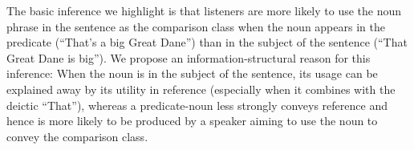 \documentclass[10pt,letterpaper]{article}
\begin{document}

The basic inference we highlight is that listeners are more likely to use the noun phrase in the sentence as the comparison class when the noun appears in the predicate (``That's a big Great Dane'') than in the subject of the sentence (``That Great Dane is big''). We propose an information-structural reason for this inference: When the noun is in the subject of the sentence, its usage can be explained away by its utility in reference  (especially when it combines with the deictic ``That''), whereas a predicate-noun less strongly conveys reference and hence is more likely to be produced by a speaker aiming to use the noun to convey the comparison class. 

 
\end{document}
